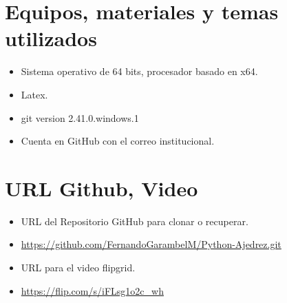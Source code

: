 \documentclass{article}
\begin{document}
	\section{Equipos, materiales y temas utilizados}
	\begin{itemize}
		\item Sistema operativo de 64 bits, procesador basado en x64.
		\item Latex. 
		\item git version 2.41.0.windows.1
		\item Cuenta en GitHub con el correo institucional.
	\end{itemize}
	\section{URL Github, Video}
	\begin{itemize}
		\item URL del Repositorio GitHub para clonar o recuperar.
		\item \url{https://github.com/FernandoGarambelM/Python-Ajedrez.git}
		\item URL para el video flipgrid.
		\item \url{https://flip.com/s/iFLsg1o2c_wh}	
	\end{itemize}
	\clearpage
\end{document}
